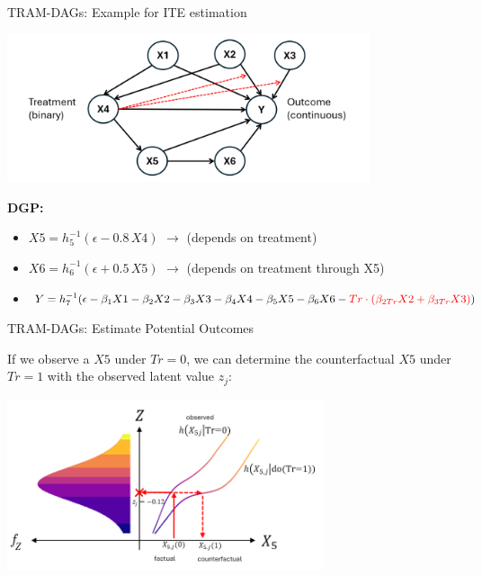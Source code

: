 \documentclass[onlytextwidth,english]{beamer}\usepackage[]{graphicx}\usepackage[]{xcolor}
\begin{document}
\begin{frame}{TRAM-DAGs: Example for ITE estimation}

\centering
\includegraphics[width=0.8\textwidth]{img/dag_ITE_observational.png}
\normalsize

\vspace{1em} %
\raggedright %

\small
\textbf{DGP:}
\begin{itemize}
    \item $X5 = h_5^{-1}(\epsilon - 0.8 \, X4 )$ \hspace{1em} $\rightarrow$ (depends on treatment)
    \item $X6 = h_6^{-1}(\epsilon + 0.5 \, X5)$ \hspace{1em} $\rightarrow$ (depends on treatment through X5)
    \item $Y = h_7^{-1}(\epsilon - \beta_1 X1 - \beta_2 X2 - \beta_3 X3 - \beta_4 X4 - \beta_5 X5 - \beta_6 X6 - \textcolor{red}{Tr \cdot (\beta_{2Tr} X2 + \beta_{3Tr} X3)})$
\end{itemize}

\end{frame}






\begin{frame}{TRAM-DAGs: Estimate Potential Outcomes}

If we observe a $X5$ under $Tr=0$, we can determine the counterfactual $X5$ under $Tr=1$ with the observed latent value $z_j$:

\centering
\includegraphics[width=0.7\textwidth]{img/counterfactual_X5.png}

\end{frame}
\end{document}
